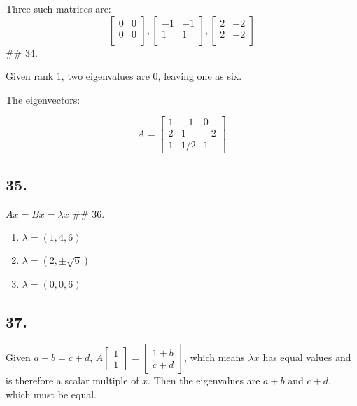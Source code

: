 \documentclass[
]{article}
\begin{document}
Three such matrices are: \[
 \begin{bmatrix}
  0 & 0\\
  0 & 0\\
\end{bmatrix},
 \begin{bmatrix}
   -1 & -1\\
    1 & 1\\
 \end{bmatrix},
 \begin{bmatrix}
   2 & -2\\
   2 & -2\\
 \end{bmatrix}
\] \#\# 34.

Given rank 1, two eigenvalues are 0, leaving one as six.

The eigenvectors:

\[A = \begin{bmatrix}
  1 & -1 & 0\\
  2 & 1 & -2\\
  1 & 1/2 & 1
\end{bmatrix}\]

\hypertarget{section-30}{%
\subsection{35.}\label{section-30}}

\(Ax = Bx = \lambda x\) \#\# 36.

\begin{enumerate}
\def\labelenumi{\alph{enumi}.}
\item
  \(\lambda = (1, 4, 6)\)
\item
  \(\lambda = (2, \pm \sqrt 6)\)
\item
  \(\lambda = (0, 0, 6)\)
\end{enumerate}

\hypertarget{section-31}{%
\subsection{37.}\label{section-31}}

Given \(a+b =c +d\),
\(A\begin{bmatrix}1\\1\end{bmatrix} = \begin{bmatrix}1 +b\\c+d\end{bmatrix}\),
which means \(\lambda x\) has equal values and is therefore a scalar
multiple of \(x\). Then the eigenvalues are \(a+b\) and \(c +d\), which
must be equal.
\end{document}
